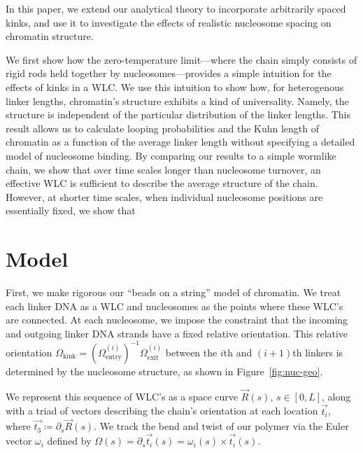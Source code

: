 \documentclass[%
 reprint,
superscriptaddress,
showpacs,preprintnumbers,
 amsmath,amssymb,
 aps,
 prl,
]{revtex4-1}
\begin{document}
In this paper, we extend our analytical theory to incorporate arbitrarily spaced
    kinks, and use it to investigate the effects of realistic nucleosome spacing
    on chromatin structure.

We first show how the zero-temperature limit---where the chain simply consists
    of rigid rods held together by nucleosomes---provides a simple intuition for
    the effects of kinks in a WLC.\@
We use this intuition to show how, for heterogenous linker lengths,
    chromatin's structure exhibits a kind of universality.
Namely, the structure is independent of the particular distribution of the
    linker lengths.
This result allows us to calculate looping probabilities and the Kuhn length
    of chromatin as a function of the average linker length without specifying a
    detailed model of nucleosome binding.
By comparing our results to a simple wormlike chain, we show that over time
    scales longer than nucleosome turnover, an effective WLC is sufficient to
    describe the average structure of the chain.
However, at shorter time scales, when individual nucleosome positions are
    essentially fixed, we show that


\section{\label{sec:model}Model}
First, we make rigorous our ``beads on a string'' model of chromatin.
We treat each linker DNA as a WLC and nucleosomes as the points where these
    WLC's are connected.
At each nucleosome, we impose the constraint that the incoming and outgoing
    linker DNA strands have a fixed relative orientation. This relative
    orientation $\Omega_\text{kink}  = {(\Omega^{(i)}_\text{entry})}^{-1}
    \Omega^{(i)}_\text{exit}$ between the $i$th and $(i+1)$th linkers is
    determined by the nucleosome structure, as shown in
    Figure~\ref{fig:nuc-geo}.

We represent this sequence of WLC's as a space curve $\vec{R}(s)$, $s\in[0,L]$, along
    with a triad of vectors describing the chain's orientation at each location
    $\vec{t_i}$, where $\vec{t_3} \coloneqq \partial_s \vec{R}(s)$.
We track the bend and twist of our polymer via the Euler vector $\omega_i$
    defined by ${\Omega(s) = \partial_s \vec{t_i}(s) = \omega_i(s) \times
    \vec{t_i}(s)}$.
\end{document}
